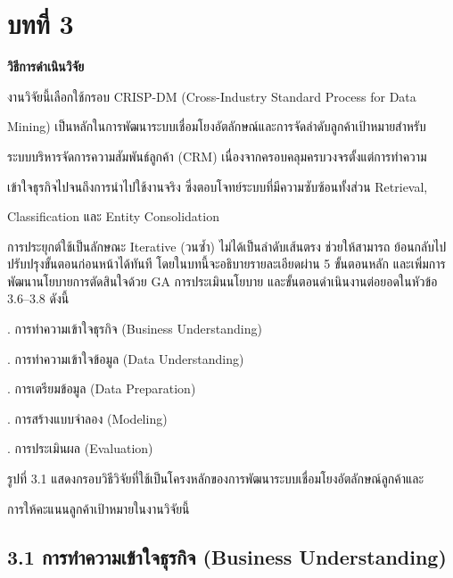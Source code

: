 \documentclass[12pt,a4paper]{report}
\begin{document}
\chapter*{บทที่ 3}
\begin{center}\Large\bfseries วิธีการดําเนินวิจัย\end{center}
งานวิจัยนี้เลือกใช้กรอบ CRISP-DM (Cross-Industry Standard Process for Data\par
Mining) เป็นหลักในการพัฒนาระบบเชื่อมโยงอัตลักษณ์และการจัดลำดับลูกค้าเป้าหมายสำหรับ\par
ระบบบริหารจัดการความสัมพันธ์ลูกค้า (CRM) เนื่องจากครอบคลุมครบวงจรตั้งแต่การทำความ\par
เข้าใจธุรกิจไปจนถึงการนำไปใช้งานจริง ซึ่งตอบโจทย์ระบบที่มีความซับซ้อนทั้งส่วน Retrieval,\par
Classification และ Entity Consolidation\par
การประยุกต์ใช้เป็นลักษณะ Iterative (วนซ้ำ) ไม่ได้เป็นลำดับเส้นตรง ช่วยให้สามารถ ย้อนกลับไปปรับปรุงขั้นตอนก่อนหน้าได้ทันที โดยในบทนี้จะอธิบายรายละเอียดผ่าน 5 ขั้นตอนหลัก และเพิ่มการพัฒนานโยบายการตัดสินใจด้วย GA การประเมินนโยบาย และขั้นตอนดำเนินงานต่อยอดในหัวข้อ 3.6--3.8 ดังนี้\par
{}. การทำความเข้าใจธุรกิจ (Business Understanding)\par
{}. การทำความเข้าใจข้อมูล (Data Understanding)\par
{}. การเตรียมข้อมูล (Data Preparation)\par
{}. การสร้างแบบจำลอง (Modeling)\par
{}. การประเมินผล (Evaluation)\par
\begin{center}\small รูปที่ 3.1 แสดงกรอบวิธีวิจัยที่ใช้เป็นโครงหลักของการพัฒนาระบบเชื่อมโยงอัตลักษณ์ลูกค้าและ\end{center}
การให้คะแนนลูกค้าเป้าหมายในงานวิจัยนี้\par
\clearpage
\section*{3.1 การทำความเข้าใจธุรกิจ (Business Understanding)}
\end{document}

